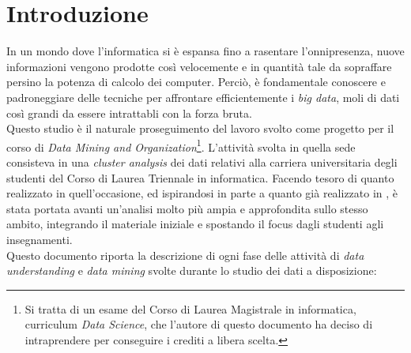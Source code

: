 \chapter{Introduzione}
\label{ch:intro}

In un mondo dove l'informatica si è espansa fino a rasentare l'onnipresenza, nuove informazioni vengono prodotte così velocemente e in quantità tale da sopraffare persino la potenza di calcolo dei computer. Perciò, è fondamentale conoscere e padroneggiare delle tecniche per affrontare efficientemente i \textit{big data}, moli di dati così grandi da essere intrattabli con la forza bruta. \\

Questo studio è il naturale proseguimento del lavoro svolto come progetto per il corso di \textit{Data Mining and Organization}\footnote{Si tratta di un esame del Corso di Laurea Magistrale in informatica, curriculum \textit{Data Science}, che l'autore di questo documento ha deciso di intraprendere per conseguire i crediti a libera scelta.}. L'attività svolta in quella sede consisteva in una \textit{cluster analysis} dei dati relativi alla carriera universitaria degli studenti del Corso di Laurea Triennale in informatica. Facendo tesoro di quanto realizzato in quell'occasione, ed ispirandosi in parte a quanto già realizzato in \cite{articolo}, è stata portata avanti un'analisi molto più ampia e approfondita sullo stesso ambito, integrando il materiale iniziale e spostando il focus dagli studenti agli insegnamenti. \\

Questo documento riporta la descrizione di ogni fase delle attività di \textit{data understanding} e \textit{data mining} svolte durante lo studio dei dati a disposizione:

